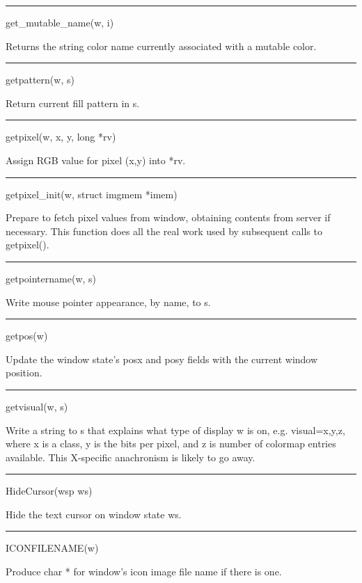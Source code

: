 {\sffamily\bfseries
\bigskip\hrule\vspace{0.1cm}
\noindent
get\_mutable\_name(w, i)}


Returns the string color name currently associated with a mutable color.


{\sffamily\bfseries
\bigskip\hrule\vspace{0.1cm}
\noindent
getpattern(w, s)}


Return current fill pattern in s.


{\sffamily\bfseries
\bigskip\hrule\vspace{0.1cm}
\noindent
getpixel(w, x, y, long *rv)}


Assign RGB value for pixel (x,y) into *rv.


{\sffamily\bfseries
\bigskip\hrule\vspace{0.1cm}
\noindent
getpixel\_init(w, struct imgmem *imem)}


Prepare to fetch pixel values from window, obtaining contents from
server if necessary. This function does all the real work used by
subsequent calls to getpixel().


{\sffamily\bfseries
\bigskip\hrule\vspace{0.1cm}
\noindent
getpointername(w, s)}


Write mouse pointer appearance, by name, to s.


{\sffamily\bfseries
\bigskip\hrule\vspace{0.1cm}
\noindent
getpos(w)}


Update the window state's posx and posy fields with the current window position.


{\sffamily\bfseries
\bigskip\hrule\vspace{0.1cm}
\noindent
getvisual(w, s)}


Write a string to s that explains what type of display w is on,
e.g. {\textquotedbl}visual=x,y,z{\textquotedbl}, where x is a class, y
is the bits per pixel, and z is number of colormap entries
available. This X-specific anachronism is likely to go away.


{\sffamily\bfseries
\bigskip\hrule\vspace{0.1cm}
\noindent
HideCursor(wsp ws)}


Hide the text cursor on window state ws.


{\sffamily\bfseries
\bigskip\hrule\vspace{0.1cm}
\noindent
ICONFILENAME(w)}


Produce char * for window's icon image file name if there is one.


